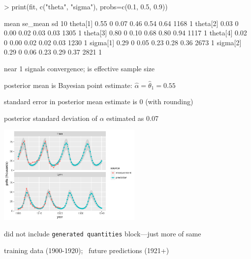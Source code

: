 \documentclass[10pt]{report}
\begin{document}
%
{\footnotesize
\begin{stancode}
> print(fit, c("theta", "sigma"), probs=c(0.1, 0.5, 0.9))
\end{stancode}
\vspace*{-2pt}
\begin{stancode}
         mean se_mean    sd   10%
theta[1] 0.55       0  0.07  0.46  0.54  0.64   1168    1
theta[2] 0.03       0  0.00  0.02  0.03  0.03   1305    1
theta[3] 0.80       0  0.10  0.68  0.80  0.94   1117    1
theta[4] 0.02       0  0.00  0.02  0.02  0.03   1230    1
sigma[1] 0.29       0  0.05  0.23  0.28  0.36   2673    1
sigma[2] 0.29       0  0.06  0.23  0.29  0.37   2821    1
\end{stancode}
}
\vspace*{4pt}
\begin{subitemize}
\item {} near 1 signals convergence;
  is effective sample size
\item posterior mean is Bayesian point estimate: $\hat{\alpha} =
  \widehat{\theta}_1 = 0.55$
\vspace*{-3pt}
\item standard error in posterior mean estimate is 0 (with rounding)
\vspace*{-3pt}
\item posterior standard deviation of $\alpha$ estimated as 0.07
\end{subitemize}

%
\vspace*{-4pt}
\begin{center}
\includegraphics[width=0.525\textwidth]{img/lotka-volterra-predict.pdf}
\end{center}
\vspace*{-6pt}
\begin{subsubitemize}
\item did not include \texttt{generated quantities} block---just more of same
\item training data (1900-1920); \ future predictions (1921+)
\end{subsubitemize}
\end{document}
